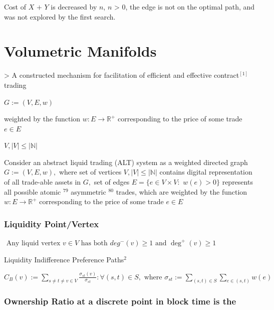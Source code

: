 {Cost of $X$ $+$ $Y$ is decreased by $n$, $n$ > $0$, the edge is not on the optimal path, and was not explored by
the first search.



\newpage

\chapter{Volumetric Manifolds}

> A constructed mechanism for facilitation of efficient and effective contract$^[1]$ trading 

$
G:=(V, E, w)
$



weighted by the function $w: E \rightarrow \mathbb{R}^{+}$ corresponding to the price of some trade $e \in E$


$ V,|V| \leq|\mathbb{N}| $



Consider an abstract liquid trading (ALT) system as a weighted directed graph $G:=(V, E, w),$ where set of vertices $V,|V| \leq|\mathbb{N}|$ contains digital representation of all trade-able assets in $G,$ set of edges $E=\{e \in V \times V:$ $w(e)>0\}$ represents all possible atomic $^{79}$ asymmetric $^{80}$ trades, which are weighted by the function $w: E \rightarrow \mathbb{R}^{+}$ corresponding to the price of some trade $e \in E$


\subsection{Liquidity Point/Vertex}

$
\text { Any liquid vertex } v \in V \text{ has both } d e g^{-}(v) \geq 1 \text{ and } \operatorname{deg}^{+}(v) \geq 1
$


Liquidity Indifference Preference Paths$^{2}$

$C_{B}(v):=\sum_{s \neq t \neq v \in V} \frac{\sigma_{s t}(v)}{\sigma_{s t}}: \forall(s, t) \in S, \text{ where } \sigma_{s t}:=\sum_{(s, t) \in S} \sum_{e \in(s, t)} w(e)$


\subsection{Ownership Ratio at a discrete point in block time
is the \label{Ownership Ratio at a discrete point in block time and
\begin{equation}
\theta=\frac{B_{t}(h)}{S_{t}}
\end{equation}


}}}
